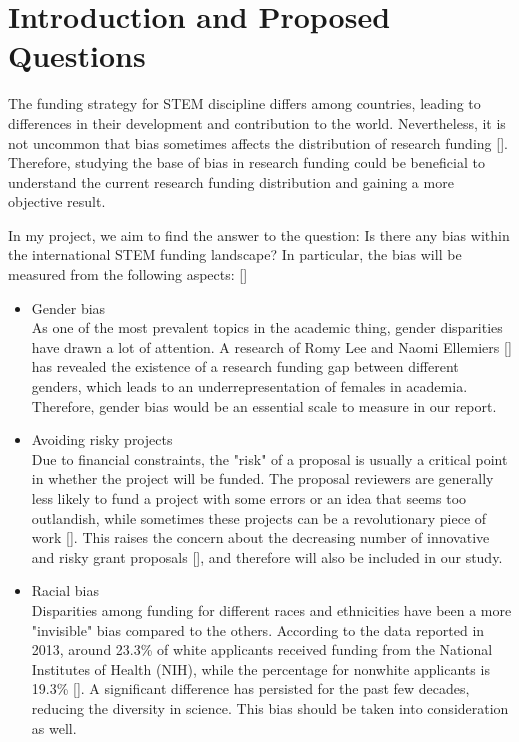 \documentclass[11pt, oneside]{article}   	%
\begin{document}
\section{Introduction and Proposed Questions}

The funding strategy for STEM discipline differs among countries, leading to differences in their development and contribution to the world. Nevertheless, it is not uncommon that bias sometimes affects the distribution of research funding [\cite{crudden2022gender}]. Therefore, studying the base of bias in research funding could be beneficial to understand the current research funding distribution and gaining a more objective result.

\bigbreak
\noindent In my project, we aim to find the answer to the question: Is there any bias within the international STEM funding landscape? In particular, the bias will be measured from the following aspects: [\cite{wojick2015government}]

\begin{itemize}
\item Gender bias
\\As one of the most prevalent topics in the academic thing, gender disparities have drawn a lot of attention. A research of Romy Lee and Naomi Ellemiers [\cite{van2015gender}] has revealed the existence of a research funding gap between different genders, which leads to an underrepresentation of females in academia. Therefore, gender bias would be an essential scale to measure in our report.
\item Avoiding risky projects
\\Due to financial constraints, the "risk" of a proposal is usually a critical point in whether the project will be funded. The proposal reviewers are generally less likely to fund a project with some errors or an idea that seems too outlandish, while sometimes these projects can be a revolutionary piece of work [\cite{franzoni2022funding}]. This raises the concern about the decreasing number of innovative and risky grant proposals [\cite{severin2021research}], and therefore will also be included in our study.
\item Racial bias
\\Disparities among funding for different races and ethnicities have been a more "invisible" bias compared to the others. According to the data reported in 2013, around 23.3\% of white applicants received funding from the National Institutes of Health (NIH), while the percentage for nonwhite applicants is 19.3\% [\cite{konkel2015racial}]. A significant difference has persisted for the past few decades, reducing the diversity in science. This bias should be taken into consideration as well.
\end{itemize}
\end{document}
